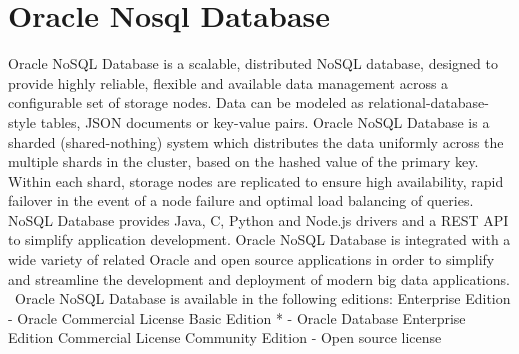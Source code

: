 \section{Oracle Nosql Database}

Oracle NoSQL Database is a scalable, distributed NoSQL database, 
designed to provide highly reliable, flexible and available data 
management across a configurable set of storage nodes.
Data can be modeled as relational-database-style tables, JSON 
documents or key-value pairs. Oracle NoSQL Database is a sharded 
(shared-nothing) system which distributes the data uniformly across 
the multiple shards in the cluster, based on the hashed value of the 
primary key. Within each shard, storage nodes are replicated to ensure 
high availability, rapid failover in the event of a node failure and 
optimal load balancing of queries. NoSQL Database provides Java, C, 
Python and Node.js drivers and a REST API to simplify application 
development. Oracle NoSQL Database is integrated with a wide variety 
of related Oracle and open source applications in order to simplify 
and streamline the development and deployment of modern big data 
applications.  Oracle NoSQL Database is available in the following 
editions: 
Enterprise Edition - Oracle Commercial License
Basic Edition * - Oracle Database Enterprise Edition Commercial 
License
Community Edition - Open source license 
